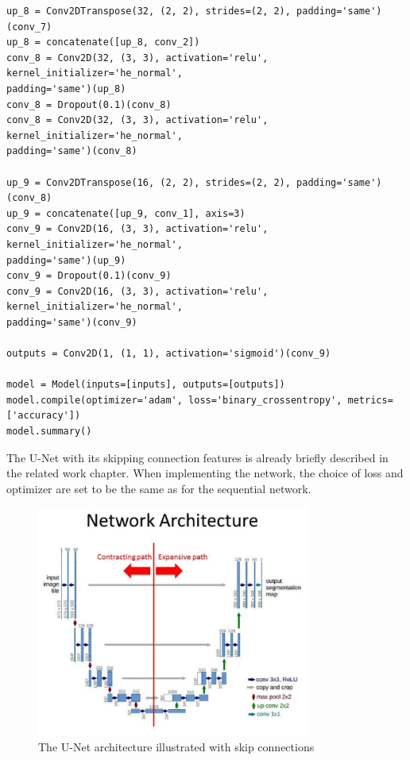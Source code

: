 \documentclass[USenglish]{ifimaster}  %
\begin{document}
\begin{verbatim}
up_8 = Conv2DTranspose(32, (2, 2), strides=(2, 2), padding='same')(conv_7)
up_8 = concatenate([up_8, conv_2])
conv_8 = Conv2D(32, (3, 3), activation='relu', kernel_initializer='he_normal', 
padding='same')(up_8)
conv_8 = Dropout(0.1)(conv_8)
conv_8 = Conv2D(32, (3, 3), activation='relu', kernel_initializer='he_normal', 
padding='same')(conv_8)

up_9 = Conv2DTranspose(16, (2, 2), strides=(2, 2), padding='same')(conv_8)
up_9 = concatenate([up_9, conv_1], axis=3)
conv_9 = Conv2D(16, (3, 3), activation='relu', kernel_initializer='he_normal', 
padding='same')(up_9)
conv_9 = Dropout(0.1)(conv_9)
conv_9 = Conv2D(16, (3, 3), activation='relu', kernel_initializer='he_normal', 
padding='same')(conv_9)

outputs = Conv2D(1, (1, 1), activation='sigmoid')(conv_9)

model = Model(inputs=[inputs], outputs=[outputs])
model.compile(optimizer='adam', loss='binary_crossentropy', metrics=['accuracy'])
model.summary()

\end{verbatim}

The U-Net with its skipping connection features is already briefly described in the related work chapter. When implementing the network, the choice of loss and optimizer are set to be the same as for the sequential network. 

\begin{figure}[ht]
    \centering
    \includegraphics[width=0.8\textwidth]{bilder/u-net_architecture_method.png}
    \caption{The U-Net architecture illustrated with skip connections \cite{website:u-net_method}}
    \label{fig:u_net_method_chapter}
\end{figure}
\end{document}
